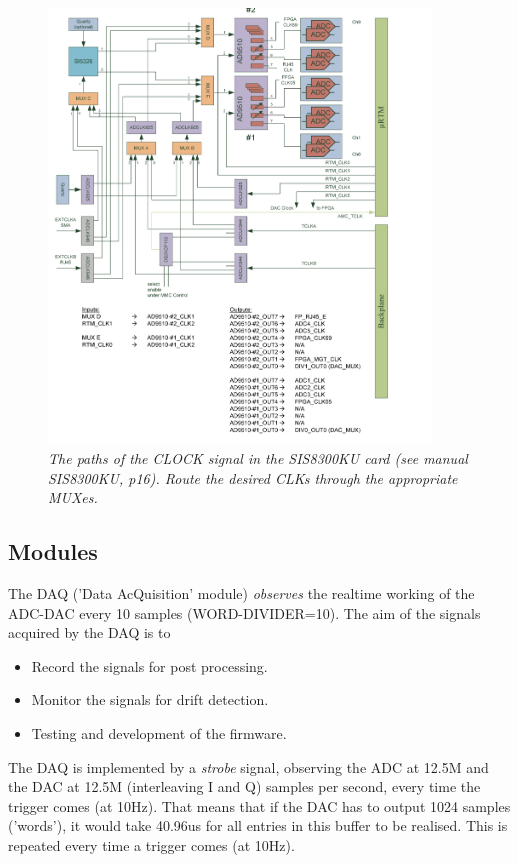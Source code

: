 \documentclass[12pt]{amsart}
\begin{document}
\begin{figure}[htbp] %
   \centering
   \includegraphics[width=4in]{im/clockSIS.png} 
   \caption{\em The paths of the CLOCK signal in the SIS8300KU card (see manual SIS8300KU, p16). 
   	Route the desired CLKs through the appropriate MUXes.}
   \label{fig:clock}
\end{figure}
 
 
 
 \subsection{Modules}


The DAQ ('Data AcQuisition' module) {\em observes} the realtime working of the ADC-DAC every 10 samples (WORD-DIVIDER=10).
The aim of the signals acquired by the DAQ is to 
\begin{itemize}
\item Record the signals for post processing.
\item Monitor the signals for drift detection.
\item Testing and development of the firmware.
\end{itemize}
The DAQ is implemented by a {\em strobe} signal, observing the ADC at 12.5M and the DAC at 12.5M (interleaving I and Q) samples per second,
every time the trigger comes (at 10Hz). That means that if the DAC has to output 1024 samples ('words'), it would take 40.96us 
for all entries in this buffer to be realised. This is repeated every time a trigger comes (at 10Hz).
\end{document}
